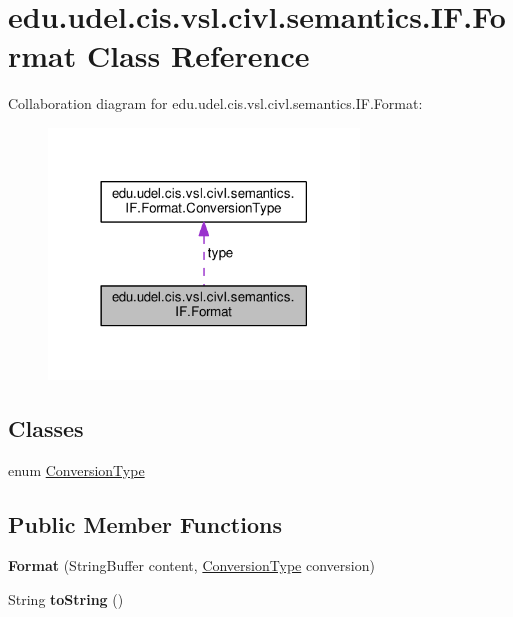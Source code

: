 \hypertarget{classedu_1_1udel_1_1cis_1_1vsl_1_1civl_1_1semantics_1_1IF_1_1Format}{}\section{edu.\+udel.\+cis.\+vsl.\+civl.\+semantics.\+I\+F.\+Format Class Reference}
\label{classedu_1_1udel_1_1cis_1_1vsl_1_1civl_1_1semantics_1_1IF_1_1Format}


Collaboration diagram for edu.\+udel.\+cis.\+vsl.\+civl.\+semantics.\+I\+F.\+Format\+:
\nopagebreak
\begin{figure}[H]
\begin{center}
\leavevmode
\includegraphics[width=234pt]{classedu_1_1udel_1_1cis_1_1vsl_1_1civl_1_1semantics_1_1IF_1_1Format__coll__graph}
\end{center}
\end{figure}
\subsection*{Classes}
\begin{DoxyCompactItemize}
\item 
enum \hyperlink{enumedu_1_1udel_1_1cis_1_1vsl_1_1civl_1_1semantics_1_1IF_1_1Format_1_1ConversionType}{Conversion\+Type}
\end{DoxyCompactItemize}
\subsection*{Public Member Functions}
\begin{DoxyCompactItemize}
\item 
\hypertarget{classedu_1_1udel_1_1cis_1_1vsl_1_1civl_1_1semantics_1_1IF_1_1Format_abade18800c76119de1e439769ac5789b}{}{\bfseries Format} (String\+Buffer content, \hyperlink{enumedu_1_1udel_1_1cis_1_1vsl_1_1civl_1_1semantics_1_1IF_1_1Format_1_1ConversionType}{Conversion\+Type} conversion)\label{classedu_1_1udel_1_1cis_1_1vsl_1_1civl_1_1semantics_1_1IF_1_1Format_abade18800c76119de1e439769ac5789b}

\item 
\hypertarget{classedu_1_1udel_1_1cis_1_1vsl_1_1civl_1_1semantics_1_1IF_1_1Format_a34cfc05a263eec011163443ff559d274}{}String {\bfseries to\+String} ()\label{classedu_1_1udel_1_1cis_1_1vsl_1_1civl_1_1semantics_1_1IF_1_1Format_a34cfc05a263eec011163443ff559d274}

\end{DoxyCompactItemize}

